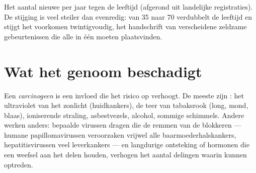 \begin{omfigure}

{\small Het aantal nieuwe  per jaar tegen de leeftijd (afgerond uit
landelijke registraties). De stijging is veel steiler dan evenredig: van
35 naar 70 verdubbelt de leeftijd en stijgt het voorkomen twintigvoudig,
het handschrift van verscheidene zeldzame gebeurtenissen die alle in één
 moeten plaatsvinden.}
\end{omfigure}

\section{Wat het genoom beschadigt}

\begin{definition}[Carcinogeen]\label{def:g11:cancer:carcinogen}
Een \emph{carcinogeen} is een invloed die het risico op
 verhoogt. De meeste zijn : het ultraviolet van het
zonlicht (huidkankers), de teer van tabaksrook (long, mond, blaas),
ioniserende straling, asbestvezels, alcohol, sommige schimmels. Andere
werken anders: bepaalde virussen dragen  die de remmen van de 
blokkeren --- humane papillomavirussen veroorzaken vrijwel alle
baarmoederhalskankers, hepatitisvirussen veel leverkankers --- en
langdurige ontsteking of hormonen die een weefsel aan het delen houden,
verhogen het aantal delingen waarin  kunnen optreden.
\end{definition}

